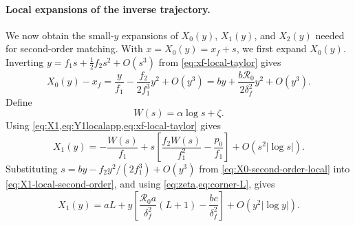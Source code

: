 \documentclass[11pt]{article}
\newcommand{\Rzero}{\mathcal R_0}
\newcommand{\xf}{x_f}
\begin{document}
\paragraph{Local expansions of the inverse trajectory.}
We now obtain the small-\(y\) expansions of \(X_0(y)\), \(X_1(y)\), and \(X_2(y)\) needed for second-order matching. With \(x=X_0(y)=\xf+s\), we first expand \(X_0(y)\).
Inverting \(y=f_1s+\tfrac12f_2s^2+O(s^3)\) from \cref{eq:xf-local-taylor} gives
\begin{equation}
X_0(y)-\xf=\frac{y}{f_1}-\frac{f_2}{2f_1^3}y^2+O(y^3)
=by+\frac{b\Rzero}{2\delta_f^2}y^2+O(y^3).
\label{eq:X0-second-order-local}
\end{equation}
Define
\[
W(s)=\alpha\log s+\zeta.
\]
Using \cref{eq:X1,eq:Y1localapp,eq:xf-local-taylor} gives
\begin{equation}
X_1(y)=-\frac{W(s)}{f_1}
+s\left[\frac{f_2W(s)}{f_1^2}-\frac{p_0}{f_1}\right]
+O(s^2|\log s|).
\label{eq:X1-local-second-order}
\end{equation}
Substituting \(s=by-f_2y^2/(2f_1^3)+O(y^3)\) from \cref{eq:X0-second-order-local} into \cref{eq:X1-local-second-order}, and using \cref{eq:zeta,eq:corner-L}, gives
\begin{equation}
X_1(y)=aL+y\left[\frac{\Rzero a}{\delta_f^2}(L+1)-\frac{bc}{\delta_f^2}\right]
+O(y^2|\log y|).
\label{eq:X1-second-order-local}
\end{equation}
\end{document}
